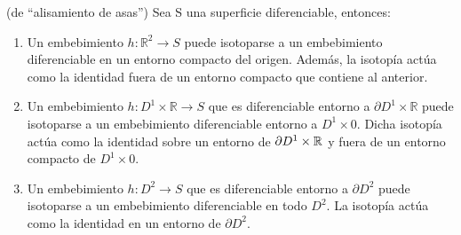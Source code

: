 

\begin{teorema} (de ``alisamiento de asas'')
	Sea S una superficie diferenciable, entonces:
	\begin{enumerate}
		\item Un embebimiento $h: \mathbb{R}^2 \rightarrow S$ puede isotoparse a un embebimiento diferenciable en un entorno compacto del origen. Además, la isotopía actúa como la identidad fuera de un entorno compacto que contiene al anterior.
		\item Un embebimiento $h: D^1\times\mathbb{R} \rightarrow S$ que es diferenciable entorno a $\partial D^1\times\mathbb{R}$ puede isotoparse a un embebimiento diferenciable entorno a $D^1\times 0$. Dicha isotopía actúa como la identidad sobre un entorno de $\partial D^1 \times \mathbb{R}$ y fuera de un entorno compacto de $D^1 \times 0$.
		\item Un embebimiento $h: D^2 \rightarrow S$ que es diferenciable entorno a $\partial D^2$ puede isotoparse a un embebimiento diferenciable en todo $D^2$. La isotopía actúa como la identidad en un entorno de $\partial D^2$.
	\end{enumerate}
\end{teorema}

